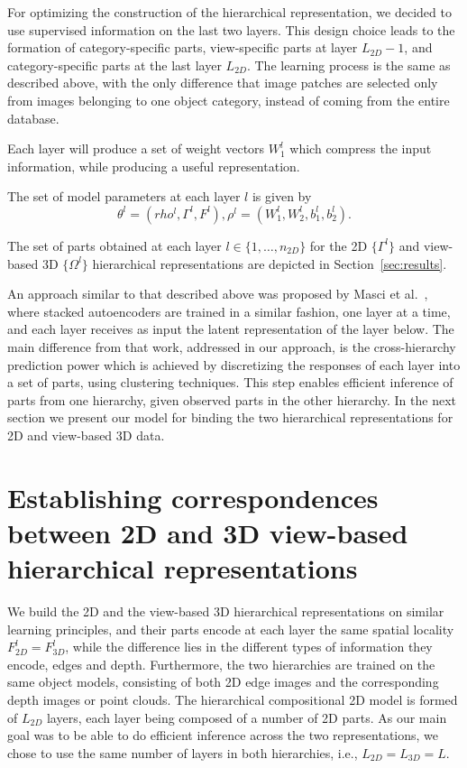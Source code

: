 \documentclass[runningheads]{llncs}
\begin{document}
For optimizing the construction of the hierarchical representation, we decided to use supervised information on the last two layers. This design choice leads to the formation of category-specific parts, view-specific parts at layer $L_{2D}-1$, and category-specific parts at the last layer $L_{2D}$. The learning process is the same as described above, with the only difference that image patches are selected only from images belonging to one object category, instead of coming from the entire database.    

Each layer will produce a set of weight vectors $W_1^l$ which compress the input information, while producing a useful representation. 

The set of model parameters at each layer $l$ is  given by
\begin{equation}
\theta^l = (rho^l,\Gamma^l,F^l),
\rho^l=(W_1^l,W_2^l,b_1^l,b_2^l).
\end{equation}

The set of parts obtained at each layer $l\in\{1,\ldots,n_{2D}\}$ for the 2D $\{\Gamma^l\}$ and view-based 3D $\{\Omega^l\}$ hierarchical representations are depicted in Section~\ref{sec:results}.

An approach similar to that described above was proposed by Masci et al.~\cite{Masci2011}, where stacked autoencoders are trained in a similar fashion, one layer at a time, and each layer receives as input the latent representation of the layer below. The main difference from that work, addressed in our approach, is the cross-hierarchy prediction power which is achieved by discretizing the responses of each layer into a set of parts, using clustering techniques. This step enables efficient inference of parts from one hierarchy, given observed parts in the other hierarchy. In the next section we present our model for binding the two hierarchical representations for 2D and view-based 3D data.
 
\section{Establishing correspondences between 2D and 3D view-based hierarchical representations}
\label{sec:analysis}

We build the 2D and the view-based 3D hierarchical representations on similar learning principles, and their parts encode at each layer the same spatial locality $F_{2D}^l=F_{3D}^l$, while the difference lies in the different types of information they encode, edges and depth.
Furthermore, the two hierarchies are trained on the same object models, consisting of both 2D edge images and the corresponding depth images or point clouds.  
The hierarchical compositional 2D model is formed of $L_{2D}$ layers, each layer being composed of a number of 2D parts. 
As our main goal was to be able to do efficient inference across the two representations, we chose to use the same number of layers in both hierarchies, i.e., $L_{2D}=L_{3D}=L$.
\end{document}
